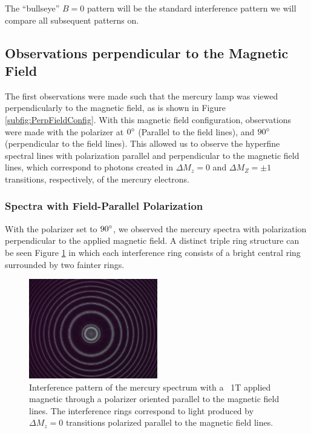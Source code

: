 \documentclass[twocolumn]{article}
\begin{document}
	 The ``bullseye'' $B=0$ pattern will be the standard interference pattern we will compare all subsequent patterns on.
	 
	\subsection{Observations perpendicular to the Magnetic Field}
		The first observations were made such that the mercury lamp was viewed perpendicularly to the magnetic field, as is shown in Figure \ref{subfig:PerpFieldConfig}.
		With this magnetic field configuration, observations were made with the polarizer at $0\degree$ (Parallel to the field lines), and $90\degree$ (perpendicular to the field lines).
		This allowed us to observe the hyperfine spectral lines with polarization parallel and perpendicular to the magnetic field lines, which correspond to photons created in $\Delta M_z = 0$ and $\Delta M_Z = \pm1$ transitions, respectively, of the mercury electrons.
		\subsubsection{Spectra with Field-Parallel Polarization}
			
			With the polarizer set to $90\degree$, we observed the mercury spectra with polarization perpendicular to the applied magnetic field. A distinct triple ring structure can be seen Figure \ref{fig:Triplet90deg} in which each interference ring consists of a bright central ring surrounded by two fainter rings. 
			
			\begin{figure}
				\centering
				\includegraphics[width=0.5\textwidth]{Images/Run1_ParallelPolarizer}
				\caption{Interference pattern of the mercury spectrum with a ~1T applied magnetic through a polarizer oriented parallel to the magnetic field lines. The interference rings correspond to light produced by $\Delta M_z = 0$ transitions polarized parallel to the magnetic field lines.}
				\label{fig:Triplet90deg}
			\end{figure}
			
\end{document}
